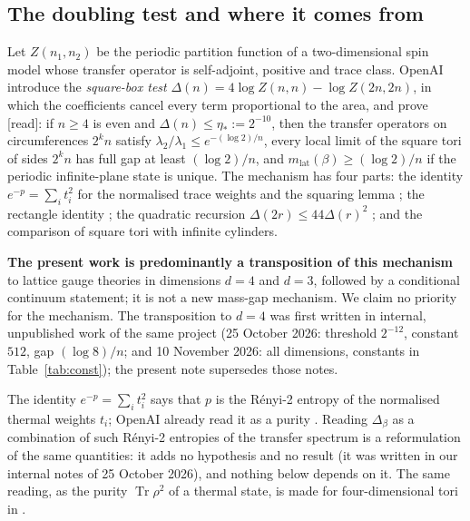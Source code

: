 \documentclass[11pt,a4paper]{article}
\theoremstyle{plain}
\theoremstyle{definition}
\theoremstyle{remark}
\numberwithin{equation}{section}
\newcommand{\Tr}{\operatorname{Tr}}
\newcommand{\st}[1]{\textsf{[#1]}}
\begin{document}
\subsection{The doubling test and where it comes from}
Let $Z(n_1,n_2)$ be the periodic partition function of a two-dimensional spin model whose transfer operator is self-adjoint, positive
and trace class. OpenAI \cite[\S2]{OAI26} introduce the \emph{square-box test} $\Delta(n)=4\log Z(n,n)-\log Z(2n,2n)$, in which the
coefficients cancel every term proportional to the area, and prove \cite[Prop.~2.2]{OAI26} \st{read}: if $n\ge4$ is even and
$\Delta(n)\le\eta_*:=2^{-10}$, then the transfer operators on circumferences $2^kn$ satisfy $\lambda_2/\lambda_1\le e^{-(\log 2)/n}$,
every local limit of the square tori of sides $2^kn$ has full gap at least $(\log2)/n$, and $m_{\mathrm{lat}}(\beta)\ge(\log 2)/n$ if
the periodic infinite-plane state is unique. The mechanism has four parts: the identity $e^{-p}=\sum_it_i^2$ for the normalised trace
weights and the squaring lemma \cite[Lemma~2.1]{OAI26}; the rectangle identity \cite[(2.7)]{OAI26}; the quadratic recursion
$\Delta(2r)\le44\Delta(r)^2$ \cite[(2.12)]{OAI26}; and the comparison of square tori with infinite cylinders.

\textbf{The present work is predominantly a transposition of this mechanism} to lattice gauge theories in dimensions $d=4$ and $d=3$,
followed by a conditional continuum statement; it is not a new mass-gap mechanism. We claim no priority for the mechanism. The transposition
to $d=4$ was first written in internal, unpublished work of the same project (25 October 2026: threshold $2^{-12}$, constant $512$, gap
$(\log8)/n$; and 10 November 2026: all dimensions, constants in Table~\ref{tab:const}); the present note supersedes those notes.

The identity $e^{-p}=\sum_it_i^2$ says that $p$ is the R\'enyi-2 entropy of the normalised thermal weights $t_i$; OpenAI already read it as
a purity \cite[\S2]{OAI26}. Reading $\Delta_\beta$ as a combination of such R\'enyi-2 entropies of the transfer spectrum
is a reformulation of the same quantities: it adds no hypothesis and no result (it was written in our internal notes of 25 October 2026),
and nothing below depends on it. The same reading, as the purity $\Tr\rho^2$ of a thermal state, is made for four-dimensional tori in
\cite[after Proposition~7.57]{BB26v5}.
\end{document}
